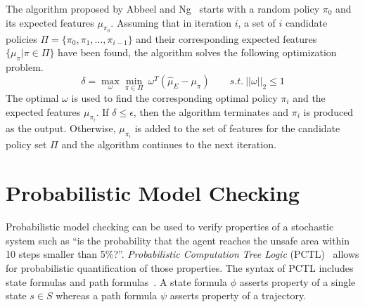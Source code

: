 The algorithm proposed by Abbeel and Ng~\cite{Abbeel:2004:ALV:1015330.1015430} starts with a random policy $\pi_0$ and its expected features $\mu_{\pi_0}$. Assuming that in iteration $i$, a set of $i$ candidate policies $\Pi=\{\pi_0, \pi_1, ..., \pi_{i-1}\}$ and their corresponding expected features $\{\mu_\pi|\pi\in\Pi\}$ have been found, the algorithm solves the following optimization problem.
\begin{equation}
\delta = \max\limits_{\omega}\min\limits_{\pi\in\Pi}\ \omega^T(\hat{\mu}_E - \mu_{\pi})\qquad s.t.\:||\omega||_2\leq 1 
\label{eq:sec1_1}
\end{equation}
The optimal $\omega$ is used to find the corresponding optimal policy $\pi_{i}$ and the expected features $\mu_{\pi_i}$. If $\delta\leq\epsilon$, then the algorithm terminates and $\pi_{i}$ is produced as the output. Otherwise, $\mu_{\pi_i}$ is added to the set of features for the candidate policy set $\Pi$ and the algorithm continues to the next iteration. 

\section{Probabilistic Model Checking}

Probabilistic model checking can be used to verify properties of a stochastic system such as ``is the probability that the agent reaches the unsafe area within 10 steps smaller than 5\%?''. \emph{Probabilistic Computation Tree Logic} (PCTL)~\cite{Hansson1994} allows for probabilistic quantification of those properties. The syntax of PCTL includes state formulas and path formulas~\cite{kwiatkowska2002prism}. A state formula $\phi$ asserts property of a single state $s\in S$ whereas a path formula $\psi$ asserts property of a trajectory. 


